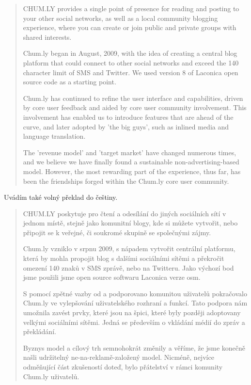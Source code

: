 \documentclass[bc,male,java,dept456]{diploma}						%
\begin{document}
\begin{quotation}
CHUM.LY provides a single point of presence for reading and posting to your other social networks, as well as a local community blogging experience, where you can create or join public and private groups with shared interests.

Chum.ly began in August, 2009, with the idea of creating a central blog platform that could connect to other social networks and exceed the 140 character limit of SMS and Twitter. We used version 8 of Laconica open source code as a starting point.

Chum.ly has continued to refine the user interface and capabilities, driven by core user feedback and aided by core user community involvement. This involvement has enabled us to introduce features that are ahead of the curve, and later adopted by 'the big guys', such as inlined media and language translation. 

The 'revenue model' and 'target market' have changed numerous times, and we believe we have finally found a sustainable non-advertising-based model. However, the most rewarding part of the experience, thus far, has been the friendships forged within the Chum.ly core user community.
\end{quotation}

Uvádím také volný překlad do češtiny.

\begin{quote}
CHUM.LY poskytuje pro čtení a odesílání do jiných sociálních sítí v jednom místě, stejně jako komunitní blogy, kde si můžete vytvořit, nebo připojit se k veřejné, či soukromé skupině se společnými zájmy.

Chum.ly vzniklo v srpnu 2009, s nápadem vytvořit centrální platformu, která by mohla propojit blog s dalšími sociálními sítěmi a překročit omezení 140 znaků v SMS zprávě, nebo na Twitteru. Jako výchozí bod jsme použili jsme open source softwaru Laconica verze osm.

S pomocí zpětné vazby od a podporovano komunitou uživatelů pokračovalo Chum.ly ve vylepšování uživatelského rozhraní a funkcí. Tato podpora nám umožnila zavést prvky, které jsou na špici, které byly později adoptovany velkými sociálními sítěmi. Jedná se především o vkládání médií do zpráv a překládání.

Byznys model a cílový trh semnohokrát změnily a věříme, že jsme konečně našli udržitelný ne-na-reklamě-založený model. Nicméně, nejvíce odměňující část zkušeností doteď, bylo přátelství v rámci komunity Chum.ly uživatelů.
\end{quote}
\end{document}
